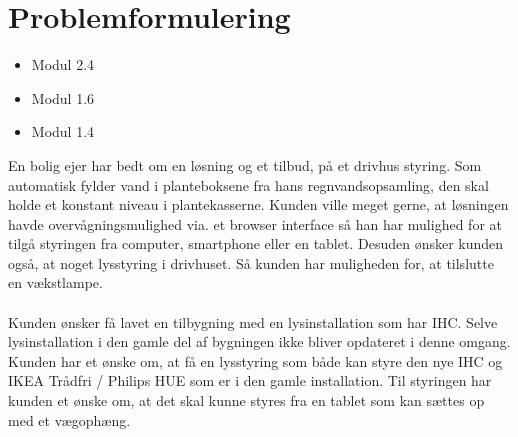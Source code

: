 \section{Problemformulering}

\begin{itemize}
    \item Modul 2.4
    \item Modul 1.6
    \item Modul 1.4
\end{itemize}

En bolig ejer har bedt om en løsning og et tilbud, på et drivhus styring. 
Som automatisk fylder vand i planteboksene fra hans regnvandsopsamling, den skal holde et konstant niveau i plantekasserne. 
Kunden ville meget gerne, at løsningen havde overvågningsmulighed via. et browser interface så han har mulighed for at tilgå styringen fra 
computer, smartphone eller en tablet.
Desuden ønsker kunden også, at noget lysstyring i drivhuset. Så kunden har muligheden for, at tilslutte en vækstlampe.
\\
\\
Kunden ønsker få lavet en tilbygning med en lysinstallation som har IHC. Selve lysinstallation i den gamle del af bygningen ikke bliver opdateret i denne omgang. 
Kunden har et ønske om, at få en lysstyring som både kan styre den nye IHC og IKEA Trådfri / Philips HUE som er i den gamle installation.
Til styringen har kunden et ønske om, at det skal kunne styres fra en tablet som kan sættes op med et vægophæng.